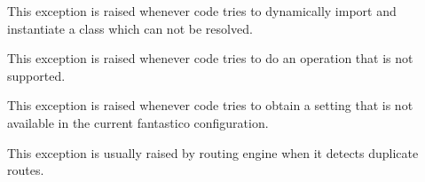 \documentclass[letterpaper,10pt,english]{sphinxmanual}
\begin{document}

\begin{fulllineitems}
\label{features/exceptions:fantastico.exceptions.FantasticoClassNotFoundError}
This exception is raised whenever code tries to dynamically import and instantiate a class which can not be resolved.

\end{fulllineitems}


\begin{fulllineitems}
\label{features/exceptions:fantastico.exceptions.FantasticoNotSupportedError}
This exception is raised whenever code tries to do an operation that is  not supported.

\end{fulllineitems}


\begin{fulllineitems}
\label{features/exceptions:fantastico.exceptions.FantasticoSettingNotFoundError}
This exception is raised whenever code tries to obtain a setting that is not available in the current fantastico
configuration.

\end{fulllineitems}


\begin{fulllineitems}
\label{features/exceptions:fantastico.exceptions.FantasticoDuplicateRouteError}
This exception is usually raised by routing engine when it detects duplicate routes.

\end{fulllineitems}
\end{document}
